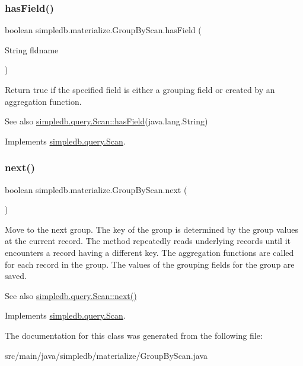 \subsubsection{\texorpdfstring{has\+Field()}{hasField()}}
{\footnotesize\ttfamily boolean simpledb.\+materialize.\+Group\+By\+Scan.\+has\+Field (\begin{DoxyParamCaption}\item[{String}]{fldname }\end{DoxyParamCaption})\hspace{0.3cm}{\ttfamily [inline]}}

Return true if the specified field is either a grouping field or created by an aggregation function. \begin{DoxySeeAlso}{See also}
\hyperlink{interfacesimpledb_1_1query_1_1Scan_a8f4ccf13eed0bed983c928e9b998fe5c}{simpledb.\+query.\+Scan\+::has\+Field}(java.\+lang.\+String) 
\end{DoxySeeAlso}


Implements \hyperlink{interfacesimpledb_1_1query_1_1Scan_a8f4ccf13eed0bed983c928e9b998fe5c}{simpledb.\+query.\+Scan}.

\mbox{\label{classsimpledb_1_1materialize_1_1GroupByScan_acbe4614c0d8a58cea2cdc86eb964dd8d}} 
\subsubsection{\texorpdfstring{next()}{next()}}
{\footnotesize\ttfamily boolean simpledb.\+materialize.\+Group\+By\+Scan.\+next (\begin{DoxyParamCaption}{ }\end{DoxyParamCaption})\hspace{0.3cm}{\ttfamily [inline]}}

Move to the next group. The key of the group is determined by the group values at the current record. The method repeatedly reads underlying records until it encounters a record having a different key. The aggregation functions are called for each record in the group. The values of the grouping fields for the group are saved. \begin{DoxySeeAlso}{See also}
\hyperlink{interfacesimpledb_1_1query_1_1Scan_a5fc77b7c76d91f89f6c09ac4f15ef351}{simpledb.\+query.\+Scan\+::next()} 
\end{DoxySeeAlso}


Implements \hyperlink{interfacesimpledb_1_1query_1_1Scan_a5fc77b7c76d91f89f6c09ac4f15ef351}{simpledb.\+query.\+Scan}.



The documentation for this class was generated from the following file\+:\begin{DoxyCompactItemize}
\item 
src/main/java/simpledb/materialize/Group\+By\+Scan.\+java\end{DoxyCompactItemize}
